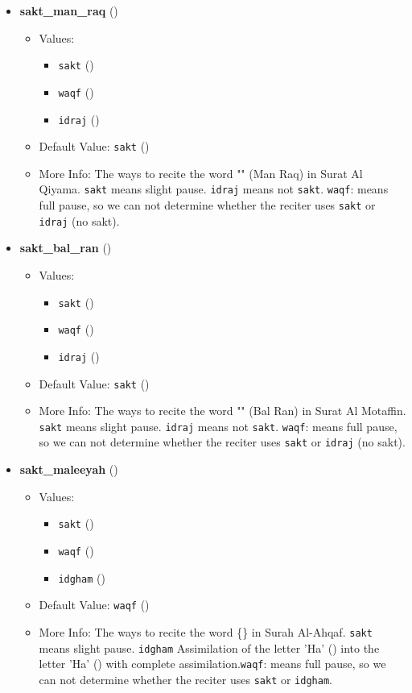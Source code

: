 \begin{itemize}
\item \textbf{sakt\_man\_raq} ()
  \begin{itemize}
  \item Values: 
    \begin{itemize}
    \item  \texttt{sakt} ()
    \item  \texttt{waqf} ()
    \item  \texttt{idraj} ()
    \end{itemize}
  \item Default Value: \texttt{sakt} ()
  \item More Info: The ways to recite the word "" (Man Raq) in Surat Al Qiyama. \texttt{sakt} means slight pause. \texttt{idraj} means not \texttt{sakt}. \texttt{waqf}: means full pause, so we can not determine whether the reciter uses \texttt{sakt} or \texttt{idraj} (no sakt).
  \end{itemize}

\item \textbf{sakt\_bal\_ran} ()
  \begin{itemize}
  \item Values: 
    \begin{itemize}
    \item  \texttt{sakt} ()
    \item  \texttt{waqf} ()
    \item  \texttt{idraj} ()
    \end{itemize}
  \item Default Value: \texttt{sakt} ()
  \item More Info: The ways to recite the word "" (Bal Ran) in Surat Al Motaffin. \texttt{sakt} means slight pause. \texttt{idraj} means not \texttt{sakt}. \texttt{waqf}: means full pause, so we can not determine whether the reciter uses \texttt{sakt} or \texttt{idraj} (no sakt).
  \end{itemize}

\item \textbf{sakt\_maleeyah} ()
  \begin{itemize}
  \item Values: 
    \begin{itemize}
    \item  \texttt{sakt} ()
    \item  \texttt{waqf} ()
    \item  \texttt{idgham} ()
    \end{itemize}
  \item Default Value: \texttt{waqf} ()
  \item More Info: The ways to recite the word \{\} in Surah Al-Ahqaf. \texttt{sakt} means slight pause. \texttt{idgham} Assimilation of the letter 'Ha' () into the letter 'Ha' () with complete assimilation.\texttt{waqf}: means full pause, so we can not determine whether the reciter uses \texttt{sakt} or \texttt{idgham}.
  \end{itemize}


\end{itemize}
